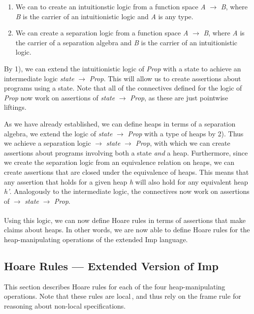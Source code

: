 \begin{enumerate}[label=\arabic*)]
\item We can to create an intuitionstic logic from a function space {\it A} $\to$ {\it B}, where {\it B} is the carrier of an intuitionistic logic and {\it A} is any type.
\item We can create a separation logic from a function space {\it A} $\to$ {\it B}, where {\it A} is the carrier of a separation algebra and {\it B} is the carrier of an intuitionistic logic.\,\cite{JBSlides}
\end{enumerate}

By 1), we can extend the intuitionistic logic of {\it Prop} with a state to achieve an intermediate logic {\it state} $\to$ {\it Prop}. This will allow us to create assertions about programs using a state. Note that all of the connectives defined for the logic of {\it Prop} now work on assertions of {\it state} $\to$ {\it Prop}, as these are just pointwise liftings.

As we have already established, we can define heaps in terms of a separation algebra, we extend the logic of {\it state} $\to$ {\it Prop} with a type of heaps by 2). Thus we achieve a separation logic \heap $\to$ {\it state} $\to$ {\it Prop}, with which we can create assertions about programs involving both a state {\it and} a heap. Furthermore, since we create the separation logic from an equivalence relation on heaps, we can create assertions that are closed under the equivalence of heaps. This means that any assertion that holds for a given heap {\it h} will also hold for any equivalent heap {\it h'}. Analogously to the intermediate logic, the connectives now work on assertions of \heap $\to$ {\it state} $\to$ {\it Prop}.

\paragraph{}
Using this logic, we can now define Hoare rules in terms of assertions that make claims about heaps. In other words, we are now able to define Hoare rules for the heap-manipulating operations of the extended Imp language. 

\subsection{Hoare Rules --- Extended Version of Imp}
\label{sec:hoare_rules_heap}
This section describes Hoare rules for each of the four heap-manipulating operations. Note that these rules are local\,\cite{Reynolds02}, and thus rely on the frame rule for reasoning about non-local specifications.
